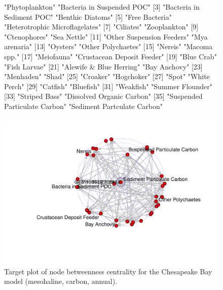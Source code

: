 \documentclass[11pt]{article}
\begin{document}
\begin{figure}[!htbp]
  \center
\begin{Schunk}
\begin{Soutput}
 [1] "Phytoplankton"                 "Bacteria in Suspended POC"    
 [3] "Bacteria in Sediment POC"      "Benthic Diatoms"              
 [5] "Free Bacteria"                 "Heterotrophic Microflagelates"
 [7] "Ciliates"                      "Zooplankton"                  
 [9] "Ctenophores"                   "Sea Nettle"                   
[11] "Other Suspension Feeders"      "Mya arenaria"                 
[13] "Oysters"                       "Other Polychaetes"            
[15] "Nereis"                        "Macoma spp."                  
[17] "Meiofauna"                     "Crustacean Deposit Feeder"    
[19] "Blue Crab"                     "Fish Larvae"                  
[21] "Alewife & Blue Herring"        "Bay Anchovy"                  
[23] "Menhaden"                      "Shad"                         
[25] "Croaker"                       "Hogchoker"                    
[27] "Spot"                          "White Perch"                  
[29] "Catfish"                       "Bluefish"                     
[31] "Weakfish"                      "Summer Flounder"              
[33] "Striped Bass"                  "Dissolved Organic Carbon"     
[35] "Suspended Particulate Carbon"  "Sediment Partculate Carbon"   
\end{Soutput}
\end{Schunk}
\includegraphics{enaR-051}
\caption{Target plot of node betweenness centrality for the Chesapeake
  Bay model (mesohaline, carbon, annual).} \label{fig:target}
\end{figure}
\end{document}
